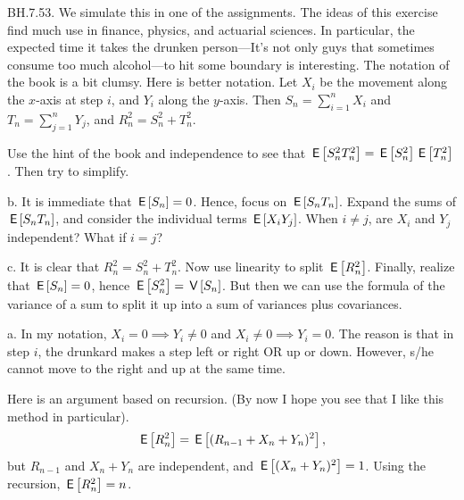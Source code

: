 \begin{exercise}
BH.7.53. We simulate this in one of the assignments.
The ideas of this exercise find much use in finance, physics, and actuarial sciences.
In particular, the expected time it takes the drunken person---It's not only guys that sometimes consume too much alcohol---to hit some boundary is interesting. The notation of the book is a bit clumsy. Here is better notation.
Let $X_i$ be the movement along the \(x\)-axis at step $i$, and $Y_i$ along the $y$-axis.
Then $S_n=\sum_{i=1}^n X_i$ and $T_n=\sum_{j=1}^n Y_{j}$, and $R_n^2= S_n^2+T_n^2$.
\begin{hint}
Use the hint of the book and independence to see that $\,\mathsf{E}\left[S_{n}^2 T_n^2\right] = \,\mathsf{E}\left[S_n^{2}\right] \,\mathsf{E}\left[T_n^{2}\right]$.
Then try to simplify.

b. It is immediate that $\,\mathsf{E}\left[S_n\right] = 0$.
Hence, focus on $\,\mathsf{E}\left[S_n T_n\right]$. Expand  the sums of $\,\mathsf{E}\left[S_n T_n\right]$, and consider the individual terms $\,\mathsf{E}\left[X_i Y_j\right]$. When $i\neq j$, are $X_i$ and $Y_{j}$  independent? What if  $i=j$?

c. It is clear that $R_n^2=S_n^2+T_{n}^2$. Now use linearity to split $\,\mathsf{E}\left[R^2_n\right]$. Finally, realize that $\,\mathsf{E}\left[S_n\right]=0$, hence $\,\mathsf{E}\left[S_n^2\right] = \,\mathsf{V}\left[S_n\right]$. But then we can use the formula of the variance of a sum to split it up into a sum of variances plus covariances.
\end{hint}

\begin{solution}
a. In my notation, $X_i=0 \implies Y_i\neq 0$ and $X_i\neq 0 \implies Y_i=0$. The reason is that in step $i$, the drunkard makes a step left or right OR up or down. However, s/he cannot move to the right and up at the same time.

Here is an argument based on recursion. (By now I hope you see that I like this method in particular).
\begin{align*}
\,\mathsf{E}\left[R_n^2\right] = \,\mathsf{E}\left[(R_{n-1} + X_n + Y_n)^{2}\right],
\end{align*}
but $R_{n-1}$ and $X_n+Y_n$ are independent, and $\,\mathsf{E}\left[(X_n + Y_n)^2\right] = 1$. Using the recursion, $\,\mathsf{E}\left[R^2_n\right] = n$.
\end{solution}
\end{exercise}

